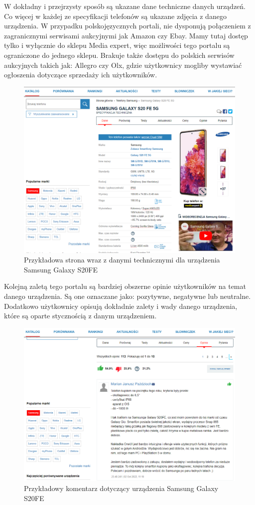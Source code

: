 W dokładny i przejrzysty sposób są ukazane dane techniczne danych urządzeń. Co więcej w każdej ze specyfikacji telefonów są ukazane zdjęcia z danego urządzenia. W przypadku polskojęzycznych portali, nie dysponują połączeniem z zagranicznymi serwisami aukcyjnymi jak Amazon czy Ebay. Mamy tutaj dostęp tylko i wyłącznie do sklepu Media expert, więc możliwości tego portalu są ograniczone do jednego sklepu.
Brakuje także dostępu do polskich serwisów aukcyjnych takich jak: Allegro czy Olx, gdzie użytkownicy mogliby wystawiać ogłoszenia dotyczące sprzedaży ich użytkowników.
\begin{figure}[H]
    \centering
    \includegraphics[width=15cm]{img/mgsm/DetailsMgsm.png}
    \caption{Przykładowa strona wraz z danymi technicznymi dla urządzenia Samsung Galaxy S20FE}
    \label{mgsm_2}
\end{figure}
Kolejną zaletą tego portalu są bardziej obszerne opinie użytkowników na temat danego urządzenia. Są one oznaczane jako: pozytywne, negatywne lub neutralne. Dodatkowo użytkownicy opisują dokładnie zalety i wady danego urządzenia, które są oparte stycznością z danym urządzeniem.
\begin{figure}[H]
    \centering
    \includegraphics[width=15cm]{img/mgsm/mgsmComments.png}
    \caption{Przykładowy komentarz dotyczący urządzenia Samsung Galaxy S20FE}
    \label{mgsm_3}
\end{figure}
